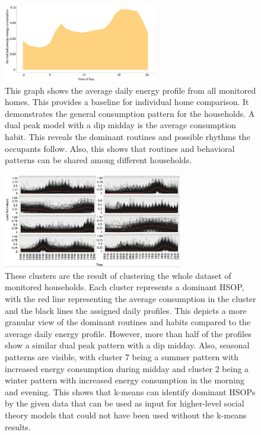 \begin{figure}
    \centering
    \includegraphics[width=0.6\textwidth]{figures/malatesta_hsop/malatesta_totalDataAveraging.jpg}
    \caption{This graph shows the average daily energy profile from all monitored homes.
    This provides a baseline for individual home comparison.
    It demonstrates the general consumption pattern for the households.
    A dual peak model with a dip midday is the average consumption habit.
    This reveals the dominant routines and possible rhythms the occupants follow.
    Also, this shows that routines and behavioral patterns can be shared among different households. 
    }
    \label{fig:total_data_averaging}
\end{figure}

\begin{figure}
    \centering
    \includegraphics[width=0.7\textwidth]{figures/malatesta_hsop/malatesta_clusteringWholeDataset.png}
    \caption{These clusters are the result of clustering the whole dataset of monitored households.
    Each cluster represents a dominant HSOP, with the red line representing the average consumption in the cluster and the black lines the assigned daily profiles.
    This depicts a more granular view of the dominant routines and habits compared to the average daily energy profile.
    However, more than half of the profiles show a similar dual peak pattern with a dip midday.
    Also, seasonal patterns are visible, with cluster 7 being a summer pattern with increased energy consumption during midday and cluster 2 being a winter pattern with increased energy consumption in the morning and evening.
    This shows that k-means can identify dominant HSOPs by the given data that can be used as input for higher-level social theory models that could not have been used without the k-means results.
    }
    \label{fig:clustering_whole_dataset}
\end{figure}

